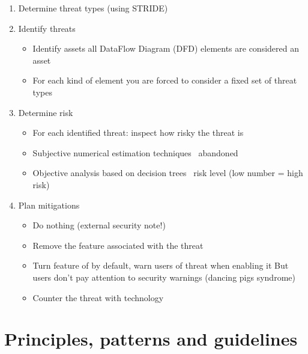 \documentclass[12pt,titlepage,a4paper]{report}
\begin{document}
\begin{enumerate}
\begin{itemize}
		\end{itemize}
		\item Determine threat types (using STRIDE)
		\item Identify threats
		\begin{itemize}
			\item Identify assets
				\subitem all DataFlow Diagram (DFD) elements are considered an asset
			\item For each kind of element you are forced to consider a fixed set of threat types
		\end{itemize}
		\item Determine risk
		\begin{itemize}
			\item For each identified threat: inspect how risky the threat is
			\item Subjective numerical estimation techniques \textrightarrow \, abandoned
			\item Objective analysis based on decision trees \textrightarrow \, risk level (low number = high risk)
		\end{itemize}
		\item Plan mitigations
		\begin{itemize}
			\item Do nothing (external security note!)
			\item Remove the feature associated with the threat
			\item Turn feature of by default, warn users of threat when enabling it
				\subitem But users don't pay attention to security warnings (dancing pigs syndrome)
			\item Counter the threat with technology
		\end{itemize}
	\end{enumerate}

	\section{Principles, patterns and guidelines}
\end{document}
